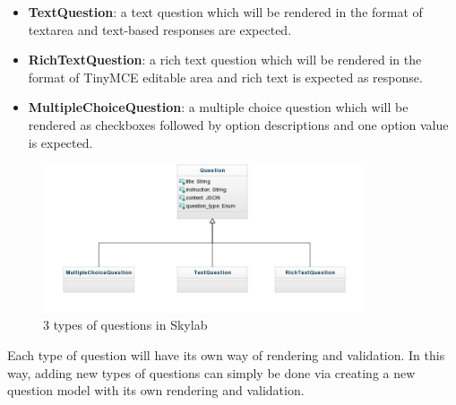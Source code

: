 \begin{itemize}
  \item \textbf{TextQuestion}: a text question which will be rendered in the format of textarea and text-based responses are expected. 
  \item \textbf{RichTextQuestion}: a rich text question which will be rendered in the format of TinyMCE editable area and rich text is expected as response.
  \item \textbf{MultipleChoiceQuestion}: a multiple choice question which will be rendered as checkboxes followed by option descriptions and one option value is expected.
\end{itemize}

\begin{figure}[h]
    \centering
    \includegraphics[width=0.85\textwidth]{Images/Skylab_Questions.jpg}
    \caption{3 types of questions in Skylab}
\end{figure}

Each type of question will have its own way of rendering and validation. In this way, adding new types of questions can simply be done via creating a new question model with its own rendering and validation.
